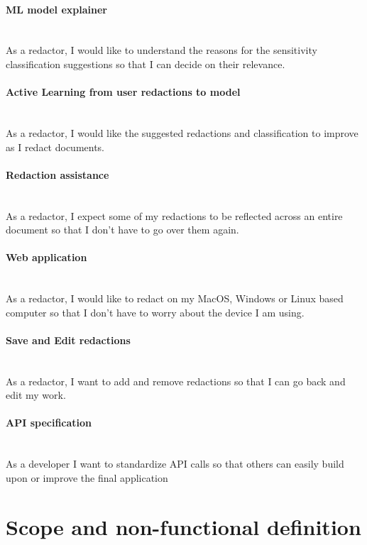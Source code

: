 \documentclass[\version]{l4proj}
\begin{document}
\paragraph*{ML model explainer}\mbox{}\\
As a redactor, I would like to understand the reasons for the sensitivity classification suggestions so that I can decide on their relevance.

\paragraph*{Active Learning from user redactions to model}\mbox{}\\
As a redactor, I would like the suggested redactions and classification to improve as I redact documents.

\paragraph*{Redaction assistance}\mbox{}\\
As a redactor, I expect some of my redactions to be reflected across an entire document so that I don’t have to go over them again.

\paragraph*{Web application}\mbox{}\\
As a redactor, I would like to redact on my MacOS, Windows or Linux based computer so that I don’t have to worry about the device I am using.

\paragraph*{Save and Edit redactions}\mbox{}\\
As a redactor, I want to add and remove redactions so that I can go back and edit my work.

\paragraph*{API specification}\mbox{}\\
As a developer I want to standardize API calls so that others can easily build upon or improve the final application

\section{Scope and non-functional definition}
\end{document}
